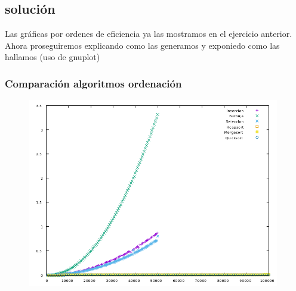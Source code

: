 \documentclass[compress]{beamer}
\begin{document}
\subsection{solución}
\begin{frame}
Las gráficas por ordenes de eficiencia ya las mostramos en el ejercicio anterior. Ahora proseguiremos explicando como las generamos y exponiedo como las hallamos (uso de gnuplot)
\end{frame}
\begin{frame}
\frametitle{Comparación algoritmos ordenación}
	\begin{figure}
  \centering
    \includegraphics[width=0.98\textwidth]{Ordenacion.png}
  \label{fig:ejemplo}
\end{figure}
	
\end{frame}
\end{document}
